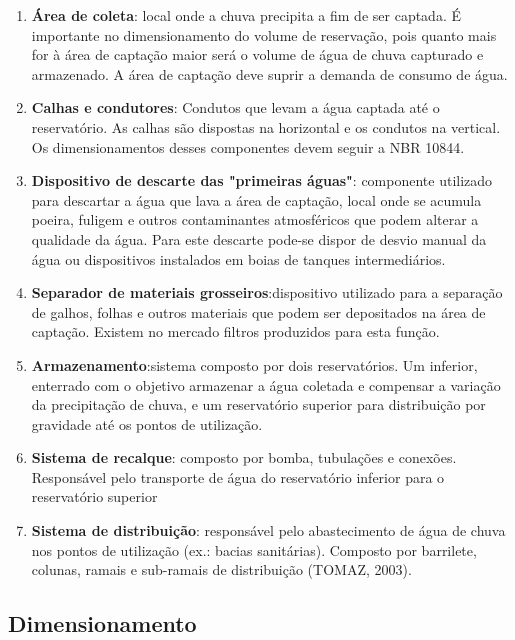 \begin{enumerate}
\item \textbf{Área de coleta}: local onde a chuva precipita a fim de ser captada. É importante no dimensionamento do volume de reservação, pois quanto mais for à área de captação maior será o volume de água de chuva capturado e armazenado. A área de captação deve suprir a demanda de consumo de água.

\item \textbf{Calhas e condutores}: Condutos que levam a água captada até o reservatório. As calhas são dispostas na horizontal e os condutos na vertical. Os dimensionamentos desses componentes devem seguir a NBR 10844.

\item \textbf{Dispositivo de descarte das "primeiras águas"}: componente utilizado para descartar a água que lava a área de captação, local onde se acumula poeira, fuligem e outros contaminantes atmosféricos que podem alterar a qualidade da água. Para este descarte pode-se dispor de desvio manual da água ou dispositivos instalados em boias de tanques intermediários.

\item \textbf{Separador de materiais grosseiros}:dispositivo utilizado para a separação de galhos, folhas e outros materiais que podem ser depositados na área de captação. Existem no mercado filtros produzidos para esta função.

\item \textbf{Armazenamento}:sistema composto por dois reservatórios. Um inferior, enterrado com o objetivo armazenar a água coletada e compensar a variação da precipitação de chuva, e um reservatório superior para distribuição por gravidade até os pontos de utilização.

\item \textbf{Sistema de recalque}: composto por bomba, tubulações e conexões. Responsável pelo transporte de água do reservatório inferior para o reservatório superior

\item \textbf{Sistema de distribuição}: responsável pelo abastecimento de água de chuva nos pontos de utilização (ex.: bacias sanitárias). Composto por barrilete, colunas, ramais e sub-ramais de distribuição (TOMAZ, 2003).

\end{enumerate}

\subsection{Dimensionamento}

